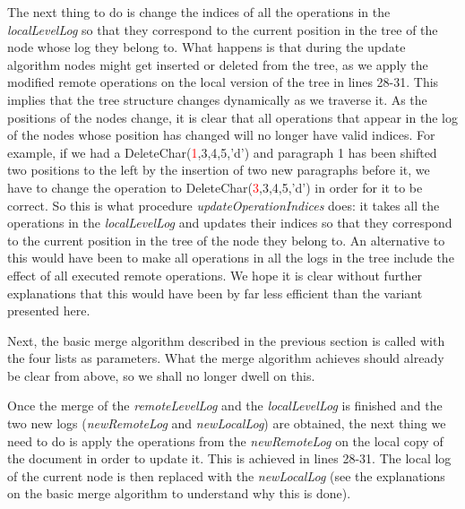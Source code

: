 The next thing to do is change the indices of all the operations in the \emph{localLevelLog} so that they
correspond to the current position in the tree of the node whose log they belong to. What happens is that
during the update algorithm nodes might get inserted or deleted from the tree, as we apply the modified
remote operations on the local version of the tree in lines 28-31. This implies that the tree structure
changes dynamically as we traverse it. As the positions of the nodes change, it is clear that all
operations that appear in the log of the nodes whose position has changed will no longer have valid
indices. For example, if we had a DeleteChar(\textcolor{red}{1},3,4,5,'d') and paragraph 1 has been
shifted two positions to the left by the insertion of two new paragraphs before it, we have to change
the operation to DeleteChar(\textcolor{red}{3},3,4,5,'d') in order for it to be correct. So this is what
procedure \emph{updateOperationIndices} does: it takes all the operations in the \emph{localLevelLog} and
updates their indices so that they correspond to the current position in the tree of the node they belong
to. An alternative to this would have been to make all operations in all the logs in the tree include
the effect of all executed remote operations. We hope it is clear without further explanations that
this would have been by far less efficient than the variant presented here.

Next, the basic merge algorithm described in the previous section is called with the four lists as
parameters. What the merge algorithm achieves should already be clear from above, so we shall no longer
dwell on this.

Once the merge of the \emph{remoteLevelLog} and the \emph{localLevelLog} is finished and the two
new logs (\emph{newRemoteLog} and \emph{newLocalLog}) are obtained, the next thing we need to do is
apply the operations from the \emph{newRemoteLog} on the local copy of the document in order to
update it. This is achieved in lines 28-31. The local log of the current node is then replaced with
the \emph{newLocalLog} (see the explanations on the basic merge algorithm to understand why this is done).

